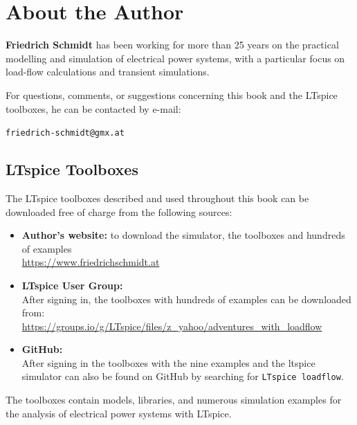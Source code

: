 \newpage
\section*{About the Author}

\textbf{Friedrich Schmidt} has been working for more than 25 years on the
practical modelling and simulation of electrical power systems, with a
particular focus on load-flow calculations and transient simulations.

\vspace{0.5em}

\noindent
For questions, comments, or suggestions concerning this book and the
LTspice toolboxes, he can be contacted by e-mail:

\begin{center}
	\texttt{friedrich-schmidt@gmx.at}
\end{center}

\subsection*{LTspice Toolboxes}

The LTspice toolboxes described and used throughout this book can be
downloaded free of charge from the following sources:

\begin{itemize}
	
	\item \textbf{Author's website:} to download the simulator, the toolboxes and hundreds of examples\\[2mm]
	\url{https://www.friedrichschmidt.at}
	
	\item \textbf{LTspice User Group:}\\[2mm]
	After signing in, the toolboxes with hundreds of examples can be
	downloaded from:\\
	\url{https://groups.io/g/LTspice/files/z_yahoo/adventures_with_loadflow}
	
	\item \textbf{GitHub:}\\[2mm]
	After signing in the toolboxes with the nine examples and the ltspice simulator can also be found on GitHub by searching for \texttt{LTspice loadflow}.
	
\end{itemize}

\vspace{0.5em}

\noindent
The toolboxes contain models, libraries, and numerous simulation examples
for the analysis of electrical power systems with LTspice.

 

